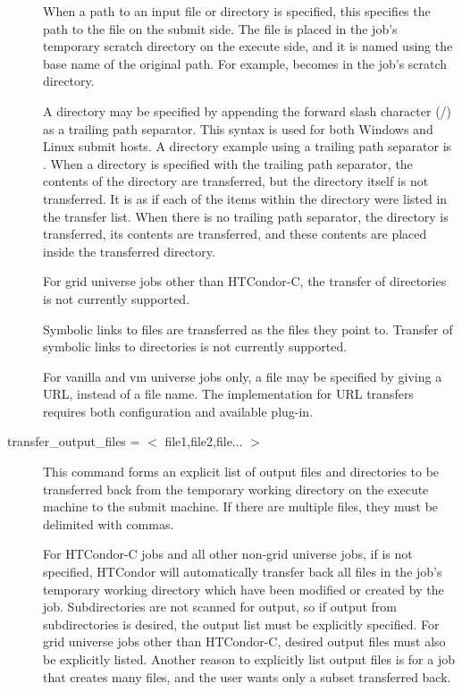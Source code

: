 \begin{description}
When a path to an input file or directory is specified, this specifies
the path to the file on the submit side.
The file is placed in the job's temporary scratch directory on the execute side,
and it is named using the base name of the original path.  For
example,  becomes  in the job's
scratch directory.

A directory may be specified by appending the forward slash character (/)
as a trailing path separator.
This syntax is used for both Windows and Linux submit hosts.
A directory example using a trailing path separator
is . 
When a directory is specified with the trailing path separator,
the contents of the directory are
transferred,  but the directory itself is not transferred.
It is as if each of the items
within the directory were listed in the transfer list.
When there is no trailing path separator,
the directory is transferred, its contents are transferred,
and these contents are placed inside the transferred directory.

For grid universe jobs other than HTCondor-C, the transfer of
directories is not currently supported.

Symbolic links to files are transferred as the files they point to.
Transfer of symbolic links to directories is not currently supported.

For vanilla and vm universe jobs only,
a file may be specified by giving a URL, instead of a file name.
The implementation for URL transfers requires both configuration
and available plug-in. 
 

\label{man-condor-submit-transfer-output-files}
\item[transfer\_output\_files = $<$ file1,file2,file... $>$]
This command forms an explicit list of output files and directories 
to be transferred
back from the temporary working directory on the execute machine to
the submit machine.
If there are multiple files, they must be delimited with commas.

For HTCondor-C jobs and all other non-grid universe jobs,
if  is not specified,
HTCondor will automatically transfer back all files in the job's
temporary working directory which have been
modified or created by the job.  Subdirectories are not scanned for
output, so if output from subdirectories is desired, the output list
must be explicitly specified.
For grid universe jobs other than HTCondor-C, desired output files must
also be explicitly listed.
Another reason to explicitly list output files is for a job that creates
many files, and the user wants only a subset transferred back.


\end{description}
